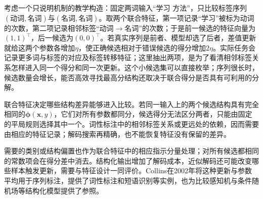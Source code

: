 考虑一个只说明机制的教学构造：固定两词输入“学习 方法”，只比较标签序列$(\text{动词},\text{名词})$与$(\text{名词},\text{名词})$。取两个联合特征，第一项记录“学习”被标为动词的次数，第二项记录相邻标签“动词$\to$名词”的次数；于是前一候选的特征向量为$(1,1)^\top$，后一候选为$(0,0)^\top$。若真实序列是前者、模型却选了后者，差值更新就给这两个参数各增加$\eta$，使正确候选相对于错误候选的得分增加$2\eta$。实际任务会记录更多词与标签的对应及标签转移特征；这里抽出两项，是为了看清相邻标签关系怎样进入同一个得分和同一次更新。这个小候选集可以直接枚举；序列很长时，候选数量会增长，能否高效寻找最高分结构还取决于联合得分是否具有可利用的分解。

联合特征决定哪些结构差异能够进入比较。若同一输入上的两个候选结构具有完全相同的$\bm\phi(\bm x,y)$，它们对所有参数都同分，候选得分无法区分两者，只能由固定的平局规则选择其中一个。词性标注中的相邻标签关系或更远处的依赖，因而需要由相应的特征记录；解码搜索再精确，也不能恢复特征没有保留的差异。

需要的类别或结构偏置也作为联合特征中的相应指示分量处理；对所有候选都相同的常数项会在得分差中消去。结构化输出增加了解码成本，近似解码还可能改变哪些样本触发更新，需要与特征设计一同评价。Collins在2002年将这种更新与参数平均用于序列标注，提供了词性标注和短语识别等实例，也为比较感知机与条件随机场等结构化模型提供了参照。

